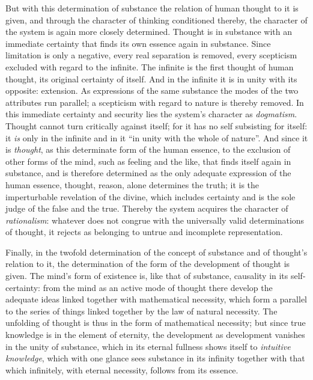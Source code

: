 \documentclass[12pt,a4paper,openany]{book}
\newcommand{\opage}[1]{\marginnote{\footnotesize\textit{[#1]}}}
\begin{document}
But with this determination of substance the
relation of human thought to it is given, and through
the character of thinking conditioned thereby, the character of the system
is again more closely determined. Thought is in substance
with an immediate certainty that finds its own essence again in substance.
Since limitation is only a negative, every real
\opage{173} separation is removed, every scepticism excluded with regard
to the infinite. The infinite is the first thought of human
thought, its original certainty of itself.
And in the infinite it is in unity with its opposite:
extension. As expressions of the same substance the
modes of the two attributes run parallel; a scepticism with regard
to nature is thereby removed. In this immediate certainty
and security lies the system's character as \emph{dogmatism}.
Thought cannot turn critically against itself;
for it has no self subsisting for itself: it \emph{is} only in the
infinite and in it ``in unity with the whole of nature''. And since
it is \emph{thought}, as this determinate form of the human
essence, to the exclusion of other forms of the mind,
such as feeling and the like, that finds itself again in substance, and
is therefore determined as the only adequate expression of the
human essence, thought, reason, alone determines
the truth; it is the imperturbable revelation
of the divine, which includes certainty and is the sole
judge of the false and the true. Thereby the system acquires
the character of \emph{rationalism}: whatever does not congrue
with the universally valid determinations of thought, it rejects as
belonging to untrue and incomplete representation.

Finally, in the twofold determination of the concept of substance
and of thought's relation to it, the determination
of the form of the development of thought is given. The mind's form of existence is, like
that of substance, causality in its self-certainty: from the mind
as an active mode of thought there develop the adequate ideas linked together
with mathematical necessity, which form
a parallel to the series of things linked together by the law of natural
necessity. The unfolding of thought is thus in the form
of mathematical necessity; but since true
knowledge is in the element of eternity, the development
as development vanishes in the unity of substance, which in its eternal fullness
shows itself to \emph{intuitive knowledge}, which with one glance
sees substance in its infinity together with that which infinitely,
with eternal necessity, follows from its essence.
\end{document}
